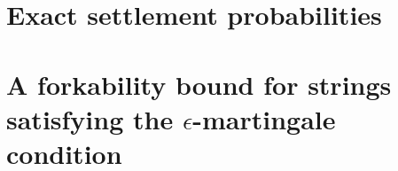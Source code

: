 \documentclass{article}
\theoremstyle{definition}
\begin{document}
\section{Exact settlement probabilities}
\label{sec:exact-prob}


%

\section{A forkability bound for strings satisfying the \texorpdfstring{$\epsilon$}{epsilon}-martingale condition}
\label{sec:martingale-proof}



% 
\end{document}
